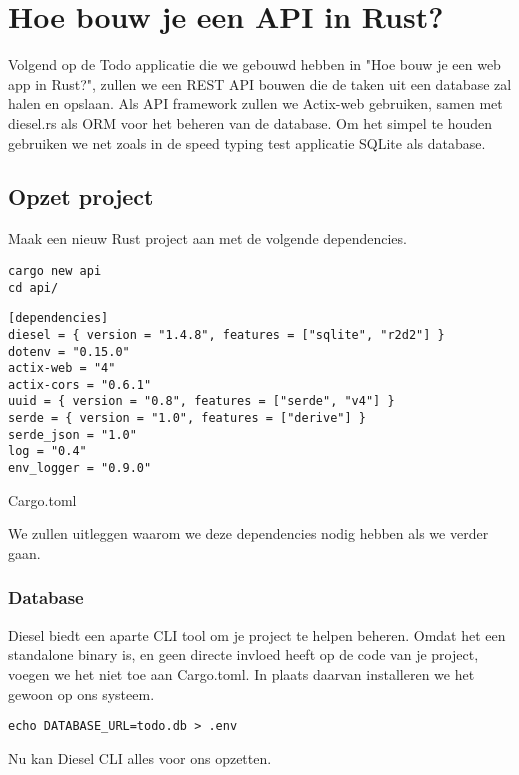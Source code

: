 \section{Hoe bouw je een API in Rust?}

Volgend op de Todo applicatie die we gebouwd hebben in "Hoe bouw je een web app in Rust?",
zullen we een REST API bouwen die de taken uit een database zal halen en opslaan. Als API framework
zullen we Actix-web gebruiken, samen met diesel.rs als ORM voor het beheren van de database. Om het
simpel te houden gebruiken we net zoals in de speed typing test applicatie SQLite als database.


\subsection{Opzet project}

Maak een nieuw Rust project aan met de volgende dependencies.

\begin{verbatim}
cargo new api
cd api/
\end{verbatim}

\begin{listing}[h]
\begin{verbatim}
[dependencies]
diesel = { version = "1.4.8", features = ["sqlite", "r2d2"] }
dotenv = "0.15.0"
actix-web = "4"
actix-cors = "0.6.1"
uuid = { version = "0.8", features = ["serde", "v4"] }
serde = { version = "1.0", features = ["derive"] }
serde_json = "1.0"
log = "0.4"
env_logger = "0.9.0"
\end{verbatim}
\caption{Cargo.toml}
\end{listing}

We zullen uitleggen waarom we deze dependencies nodig hebben als we verder gaan.

\subsubsection{Database}

Diesel biedt een aparte CLI tool om je project te helpen beheren. Omdat het een standalone binary
is, en geen directe invloed heeft op de code van je project, voegen we het niet toe aan Cargo.toml.
In plaats daarvan installeren we het gewoon op ons systeem.

\begin{verbatim}
echo DATABASE_URL=todo.db > .env
\end{verbatim}

Nu kan Diesel CLI alles voor ons opzetten.

